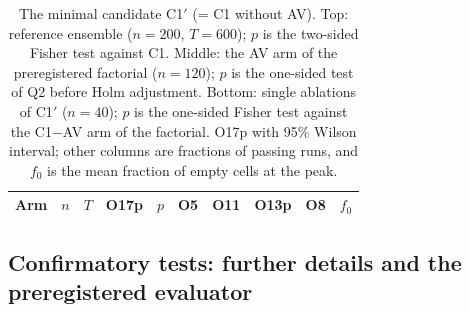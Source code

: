 \begin{table}[ht]
  \centering
  \caption{The minimal candidate \textsf{C1}$'$ (= \textsf{C1} without AV). Top: reference ensemble ($n=200$,
  $T=600$); $p$ is the two-sided Fisher test against \textsf{C1}. Middle: the AV arm of the preregistered factorial
  ($n=120$); $p$ is the one-sided test of Q2 before Holm adjustment. Bottom: single ablations of \textsf{C1}$'$
  ($n=40$); $p$ is the one-sided Fisher test against the \textsf{C1}$-$AV arm of the factorial. O17p with 95\% Wilson
  interval; other columns are fractions of passing runs, and $f_0$ is the mean fraction of empty cells at the peak.}
  \label{tab:res-c1p}
  \small
  \begin{tabular}{@{}lrrlllllll@{}}
    \toprule
    Arm & $n$ & $T$ & O17p & $p$ & O5 & O11 & O13p & O8 & $f_0$ \\
    \midrule
    
  \end{tabular}
\end{table}

\subsection{Confirmatory tests: further details and the preregistered evaluator}
\label{app:res-Q}


